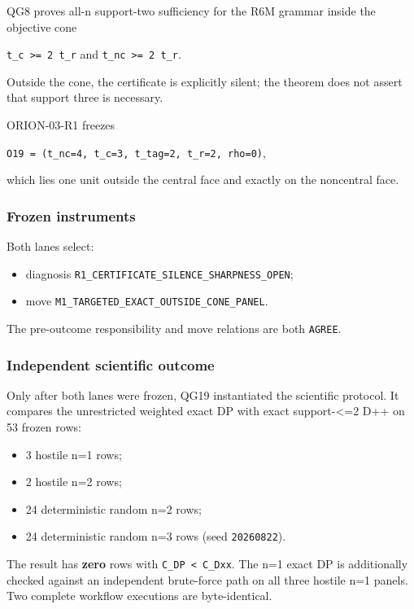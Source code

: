 \documentclass[10pt]{article}
\providecommand{\tightlist}{%
  \setlength{\itemsep}{0pt}\setlength{\parskip}{0pt}}
\begin{document}
QG8 proves all-n support-two sufficiency for the R6M grammar inside the
objective cone

\texttt{t\_c\ \textgreater{}=\ 2\ t\_r} and
\texttt{t\_nc\ \textgreater{}=\ 2\ t\_r}.

Outside the cone, the certificate is explicitly silent; the theorem does
not assert that support three is necessary.

ORION-03-R1 freezes

\texttt{O19\ =\ (t\_nc=4,\ t\_c=3,\ t\_tag=2,\ t\_r=2,\ rho=0)},

which lies one unit outside the central face and exactly on the
noncentral face.

\hypertarget{frozen-instruments}{%
\subsubsection{Frozen instruments}\label{frozen-instruments}}

Both lanes select:

\begin{itemize}
\tightlist
\item
  diagnosis \texttt{R1\_CERTIFICATE\_SILENCE\_SHARPNESS\_OPEN};
\item
  move \texttt{M1\_TARGETED\_EXACT\_OUTSIDE\_CONE\_PANEL}.
\end{itemize}

The pre-outcome responsibility and move relations are both
\texttt{AGREE}.

\hypertarget{independent-scientific-outcome}{%
\subsubsection{Independent scientific
outcome}\label{independent-scientific-outcome}}

Only after both lanes were frozen, QG19 instantiated the scientific
protocol. It compares the unrestricted weighted exact DP with exact
support-\textless=2 D++ on 53 frozen rows:

\begin{itemize}
\tightlist
\item
  3 hostile n=1 rows;
\item
  2 hostile n=2 rows;
\item
  24 deterministic random n=2 rows;
\item
  24 deterministic random n=3 rows (seed \texttt{20260822}).
\end{itemize}

The result has \textbf{zero} rows with
\texttt{C\_DP\ \textless{}\ C\_Dxx}. The n=1 exact DP is additionally
checked against an independent brute-force path on all three hostile n=1
panels. Two complete workflow executions are byte-identical.
\end{document}
